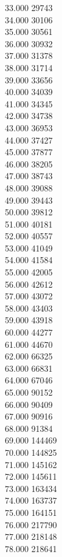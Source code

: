 { 33.000	29743 \\
 34.000	30106 \\
 35.000	30561 \\
 36.000	30932 \\
 37.000	31378 \\
 38.000	31714 \\
 39.000	33656 \\
 40.000	34039 \\
 41.000	34345 \\
 42.000	34738 \\
 43.000	36953 \\
 44.000	37427 \\
 45.000	37877 \\
 46.000	38205 \\
 47.000	38743 \\
 48.000	39088 \\
 49.000	39443 \\
 50.000	39812 \\
 51.000	40181 \\
 52.000	40557 \\
 53.000	41049 \\
 54.000	41584 \\
 55.000	42005 \\
 56.000	42612 \\
 57.000	43072 \\
 58.000	43403 \\
 59.000	43918 \\
 60.000	44277 \\
 61.000	44670 \\
 62.000	66325 \\
 63.000	66831 \\
 64.000	67046 \\
 65.000	90152 \\
 66.000	90409 \\
 67.000	90916 \\
 68.000	91384 \\
 69.000	144469 \\
 70.000	144825 \\
 71.000	145162 \\
 72.000	145611 \\
 73.000	163434 \\
 74.000	163737 \\
 75.000	164151 \\
 76.000	217790 \\
 77.000	218148 \\
 78.000	218641 \\
}
